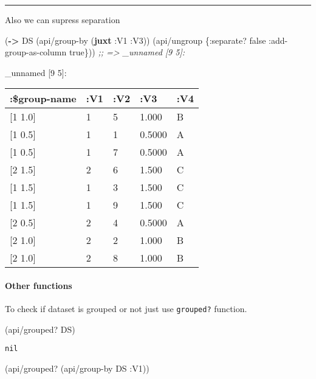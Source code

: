 \documentclass[]{article}
\newenvironment{Shaded}{\begin{snugshade}}{\end{snugshade}}
\newcommand{\KeywordTok}[1]{\textcolor[rgb]{0.13,0.29,0.53}{\textbf{#1}}}
\newcommand{\CommentTok}[1]{\textcolor[rgb]{0.56,0.35,0.01}{\textit{#1}}}
\newcommand{\VariableTok}[1]{\textcolor[rgb]{0.00,0.00,0.00}{#1}}
\newcommand{\AttributeTok}[1]{\textcolor[rgb]{0.77,0.63,0.00}{#1}}
\newcommand{\NormalTok}[1]{#1}
\let\oldparagraph\paragraph
\renewcommand{\paragraph}[1]{\oldparagraph{#1}\mbox{}}
\begin{document}
\begin{center}\rule{0.5\linewidth}{0.5pt}\end{center}

Also we can supress separation

\begin{Shaded}
\begin{Highlighting}[]
\NormalTok{(}\KeywordTok{->}\NormalTok{ DS}
\NormalTok{    (api/group-by (}\KeywordTok{juxt} \AttributeTok{:V1} \AttributeTok{:V3}\NormalTok{))}
\NormalTok{    (api/ungroup \{}\AttributeTok{:separate}\NormalTok{? }\VariableTok{false}
                  \AttributeTok{:add-group-as-column} \VariableTok{true}\NormalTok{\}))}
\CommentTok{;; => _unnamed [9 5]:}
\end{Highlighting}
\end{Shaded}

\_unnamed {[}9 5{]}:

\begin{longtable}[]{@{}lllll@{}}
\toprule
:\$group-name & :V1 & :V2 & :V3 & :V4\tabularnewline
\midrule
\endhead
{[}1 1.0{]} & 1 & 5 & 1.000 & B\tabularnewline
{[}1 0.5{]} & 1 & 1 & 0.5000 & A\tabularnewline
{[}1 0.5{]} & 1 & 7 & 0.5000 & A\tabularnewline
{[}2 1.5{]} & 2 & 6 & 1.500 & C\tabularnewline
{[}1 1.5{]} & 1 & 3 & 1.500 & C\tabularnewline
{[}1 1.5{]} & 1 & 9 & 1.500 & C\tabularnewline
{[}2 0.5{]} & 2 & 4 & 0.5000 & A\tabularnewline
{[}2 1.0{]} & 2 & 2 & 1.000 & B\tabularnewline
{[}2 1.0{]} & 2 & 8 & 1.000 & B\tabularnewline
\bottomrule
\end{longtable}

\paragraph{Other functions}\label{other-functions}

To check if dataset is grouped or not just use \texttt{grouped?}
function.

\begin{Shaded}
\begin{Highlighting}[]
\NormalTok{(api/grouped? DS)}
\end{Highlighting}
\end{Shaded}

\begin{verbatim}
nil
\end{verbatim}

\begin{Shaded}
\begin{Highlighting}[]
\NormalTok{(api/grouped? (api/group-by DS }\AttributeTok{:V1}\NormalTok{))}
\end{Highlighting}
\end{Shaded}
\end{document}

